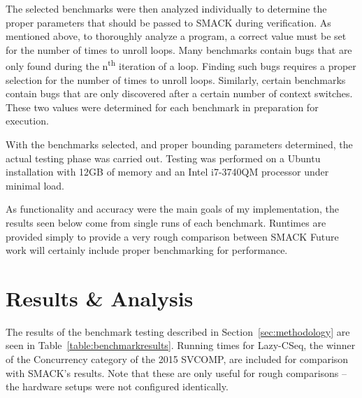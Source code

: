The selected benchmarks were then analyzed individually to determine
the proper parameters that should be passed to SMACK during
verification.  As mentioned above, to thoroughly analyze a program, a
correct value must be set for the number of times to unroll loops.
Many benchmarks contain bugs that are only found during the
n\textsuperscript{th} iteration of a loop.  Finding such bugs requires a
proper selection for the number of times to unroll loops.  Similarly,
certain benchmarks contain bugs that are only discovered after a
certain number of context switches.  These two values were determined
for each benchmark in preparation for execution.

With the benchmarks selected, and proper bounding parameters
determined, the actual testing phase was carried out.  Testing was
performed on a Ubuntu installation with 12GB of memory and an Intel
i7-3740QM processor under minimal load.

As functionality and accuracy were the main goals of my
implementation, the results seen below come from single runs of each
benchmark.  Runtimes are provided simply to provide a very rough
comparison between SMACK Future work will certainly include proper
benchmarking for performance. 

\section{Results \& Analysis}
The results of the benchmark testing described in
Section~\ref{sec:methodology} are seen in
Table~\ref{table:benchmarkresults}.  Running times for Lazy-CSeq, the winner 
of the Concurrency category of the 2015 SVCOMP, are included for
comparison with SMACK's results.  Note that these are only useful for
rough comparisons -- the hardware setups were not configured
identically.  

\newcommand{\specialcell}[3][c]{%
  \begin{tabular}[#1]{@{}#2@{}}#3\end{tabular}}

